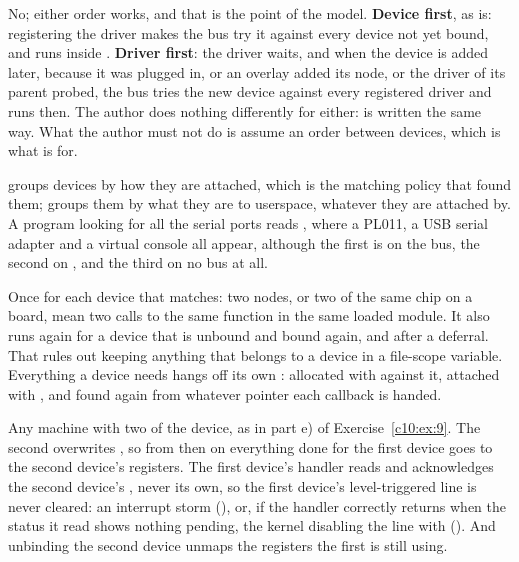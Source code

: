  No; either order works, and that is the point of the model. \textbf{Device first}, as
 is: registering the driver makes the bus try it against every device not yet bound,
and  runs inside . \textbf{Driver first}: the driver waits, and when the
device is added later, because it was plugged in, or an overlay added its node, or the driver of
its parent probed, the bus tries the new device against every registered driver and 
runs then. The author does nothing differently for either:  is written the same way.
What the author must not do is assume an order between devices, which is what
 is for.

  groups devices by how they are attached, which is the
matching policy that found them;  groups them by what they are to
userspace, whatever they are attached by. A program looking for all the serial ports reads
, where a PL011, a USB serial adapter and a virtual console all appear, although
the first is on the  bus, the second on , and the third on no bus at all.


 Once for each device that matches: two  nodes, or two of the same chip on a
board, mean two calls to the same function in the same loaded module. It also runs again for a
device that is unbound and bound again, and after a deferral. That rules out keeping anything that
belongs to a device in a file-scope variable. Everything a device needs hangs off its own
: allocated with  against it, attached with
, and found again from whatever pointer each callback is handed.

 Any machine with two of the device, as in part e) of Exercise~\ref{c10:ex:9}. The second
 overwrites , so from then on everything done for the first device goes to
the second device's registers. The first device's handler reads and acknowledges the second
device's , never its own, so the first device's level-triggered line is never
cleared: an interrupt storm (), or, if the handler correctly returns
 when the status it read shows nothing pending, the kernel disabling the line with
 (). And unbinding the second device unmaps the
registers the first is still using.

